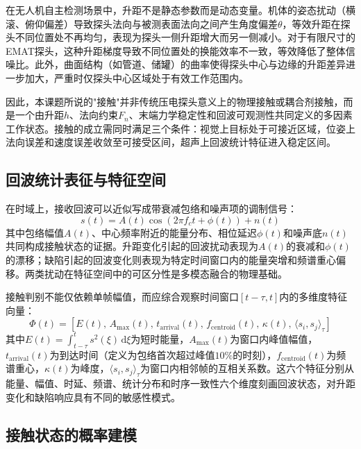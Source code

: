在无人机自主检测场景中，升距不是静态参数而是动态变量。机体的姿态扰动（横滚、俯仰偏差）导致探头法向与被测表面法向之间产生角度偏差$\theta$，等效升距在探头不同位置处不再均匀，表现为探头一侧升距增大而另一侧减小。对于有限尺寸的EMAT探头，这种升距梯度导致不同位置处的换能效率不一致，等效降低了整体信噪比。此外，曲面结构（如管道、储罐）的曲率使得探头中心与边缘的升距差异进一步加大，严重时仅探头中心区域处于有效工作范围内。

因此，本课题所说的"接触"并非传统压电探头意义上的物理接触或耦合剂接触，而是一个由升距$h$、法向约束$F_n$、末端力学稳定性和回波可观测性共同定义的多因素工作状态。接触的成立需同时满足三个条件：视觉上目标处于可接近区域，位姿上法向误差和速度误差收敛至可接受区间，超声上回波统计特征进入稳定区间。

\subsection{回波统计表征与特征空间}

在时域上，接收回波可以近似写成带衰减包络和噪声项的调制信号：
\begin{equation}
s(t) = A(t) \cos(2\pi f_c t + \phi(t)) + n(t)
\label{eq:echo_model}
\end{equation}
其中包络幅值$A(t)$、中心频率附近的能量分布、相位延迟$\phi(t)$和噪声底$n(t)$共同构成接触状态的证据。升距变化引起的回波扰动表现为$A(t)$的衰减和$\phi(t)$的漂移；缺陷引起的回波变化则表现为特定时间窗口内的能量突增和频谱重心偏移。两类扰动在特征空间中的可区分性是多模态融合的物理基础。

接触判别不能仅依赖单帧幅值，而应综合观察时间窗口$[t-\tau, t]$内的多维度特征向量：
\begin{equation}
\Phi(t) = \left[E(t),\, A_{\max}(t),\, t_{\text{arrival}}(t),\, f_{\text{centroid}}(t),\, \kappa(t),\, \langle s_i, s_j \rangle_{\tau}\right]
\label{eq:feature_vector}
\end{equation}
其中$E(t) = \int_{t-\tau}^{t} s^2(\xi)\,\mathrm{d}\xi$为短时能量，$A_{\max}(t)$为窗口内峰值幅值，$t_{\text{arrival}}(t)$为到达时间（定义为包络首次超过峰值$10\%$的时刻），$f_{\text{centroid}}(t)$为频谱重心，$\kappa(t)$为峰度，$\langle s_i, s_j \rangle_{\tau}$为窗口内相邻帧的互相关系数。这六个特征分别从能量、幅值、时延、频谱、统计分布和时序一致性六个维度刻画回波状态，对升距变化和缺陷响应具有不同的敏感性模式。

\subsection{接触状态的概率建模}

